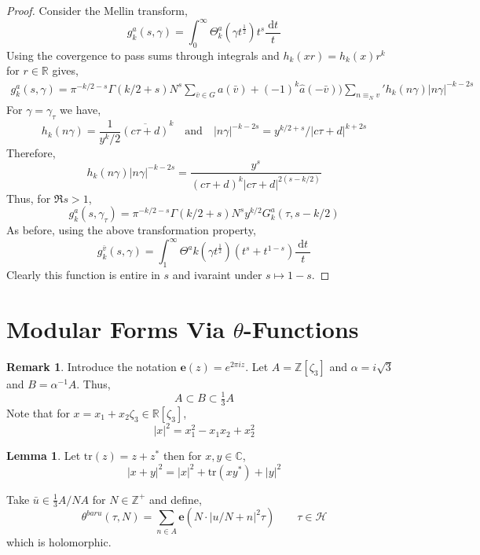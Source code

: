 \documentclass{article}
\newcommand{\Z}{\mathbb{Z}}
\newcommand{\R}{\mathbb{R}}
\newcommand{\C}{\mathbb{C}}
\newcommand{\Zplus}{\mathbb{Z}^{+}}
\renewcommand{\d}[1]{\: \mathrm{d}#1 \:}
\theoremstyle{definition}
\newtheorem{lemma}[theorem]{Lemma}
\newtheorem{remark}{Remark}[section]
\newenvironment{definition}[1][Definition:]{\begin{trivlist}
\item[\hskip \labelsep {\bfseries #1}]}{\end{trivlist}}
\newcommand{\half}{\mathcal{H}}
\begin{document}
\begin{proof}
Consider the Mellin transform,
\[ g^a_k(s, \gamma) = \int_0^\infty \Theta^a_k(\gamma t^{\frac{1}{2}}) t^s \frac{\d{t}}{t} \]
Using the covergence to pass sums through integrals and $h_k(xr) = h_k(x) r^k$ for $r \in \R$ gives,
\begin{align*}
g^a_k(s, \gamma) = \pi^{-k/2 - s} \Gamma(k/2 + s) N^s \sum_{\bar{v} \in G} a(\bar{v}) + (-1)^k \hat{a}(-\bar{v})) \sum_{n \equiv_N v}' h_k(n \gamma) |n \gamma|^{-k - 2 s} 
\end{align*}
For $\gamma = \gamma_\tau$ we have,
\[ h_k(n \gamma) = \frac{1}{y^k/2} \overline{(c \tau + d)}^k \quad \text{and} \quad |n \gamma|^{-k - 2s} = y^{k/2 + s} / |c \tau + d|^{k + 2s} \]
Therefore,
\[  h_k(n \gamma) |n \gamma|^{-k - 2s} = \frac{y^s}{(c \tau + d)^k |c \tau + d|^{2 (s - k /2)}} \]
Thus, for $\Re{s} > 1$,
\[ g^a_k(s, \gamma_\tau) = \pi^{-k/2 - s} \Gamma(k/2 + s) N^s y^{k/2} G^a_k(\tau, s - k /2) \]
As before, using the above transformation property,
\[ g^{\bar{v}}_k(s, \gamma) = \int_1^\infty \Theta^ak(\gamma t^{\frac{1}{2}}) (t^s + t^{1 - s}) \frac{\d{t}}{t} \]
Clearly this function is entire in $s$ and ivaraint under $s \mapsto 1 - s$. 
\end{proof}

\section{Modular Forms Via $\theta$-Functions}

\newcommand{\e}[1]{\mathbf{e}\left( #1 \right)}

\begin{remark}
Introduce the notation $\e{z} = e^{2 \pi i z}$. Let $A = \Z[\zeta_3]$ and $\alpha = i \sqrt{3}$ and $B = \alpha^{-1} A$. Thus,
\[ A \subset B \subset \tfrac{1}{3} A \]
Note that for $x = x_1 + x_2 \zeta_3 \in \R[\zeta_3]$,
\[ |x|^2 = x_1^2 - x_1 x_2 + x_2^2 \]
\end{remark}

\newcommand{\tr}[1]{\mathrm{tr}\left( #1 \right)}

\begin{lemma}
Let $\tr{z} = z + z^*$ then for $x, y \in \C$,
\[ |x + y|^2 = |x|^2 + \tr{x y^*} + |y|^2 \]
\end{lemma}

\begin{definition}
Take $\bar{u} \in \frac{1}{3} A / NA$ for $N \in \Zplus$ and define,
\[ \theta^{bar{u}}(\tau, N) = \sum_{n \in A} \e{N \cdot | u /N + n|^2 \tau} \quad \quad \tau \in \half \]
which is holomorphic.
\end{definition}
\end{document}
